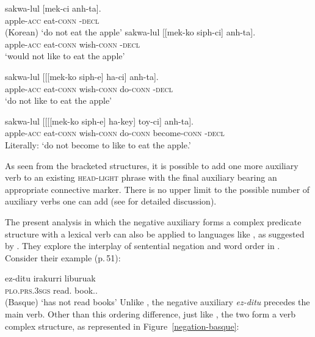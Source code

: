 \documentclass[output=paper
 	        ,biblatex
                ,babelshorthands
                ,newtxmath
                ,draftmode
                ,colorlinks, citecolor=brown
]{langscibook}
\begin{document}
\begin{exe}
\begin{xlist}
\begin{exe}
\begin{xlist}
\eal
\ex
\gll sakwa-lul          [mek-ci anh-ta]. \\
     apple-\textsc{acc} \spacebr{}eat-\textsc{conn} \NEG-\textsc{decl} \\\hfill(Korean)
\glt `do not eat the apple'
\ex
\gll sakwa-lul          [[mek-ko siph-ci] anh-ta]. \\
     apple-\textsc{acc} \hphantom{[[}eat-\textsc{conn} wish-\textsc{conn} \NEG-\textsc{decl} \\
\glt `would not like to eat the apple'

\ex \label{negation-20c}
\gll sakwa-lul          [[[mek-ko siph-e] ha-ci] anh-ta]. \\
     apple-\textsc{acc} \hphantom{[[[}eat-\textsc{conn} wish-\textsc{conn} do-\textsc{conn} \NEG-\textsc{decl} \\
\glt `do not like to eat the apple'

\ex
\gll sakwa-lul          [[[[mek-ko siph-e] ha-key] toy-ci] anh-ta]. \\
     apple-\textsc{acc} \hphantom{[[[[}eat-\textsc{conn} wish-\textsc{conn} do-\textsc{conn} become-\textsc{conn} \NEG-\textsc{decl} \\
\glt Literally: `do not become to like to eat the apple.'
\end{xlist} \end{exe}
%
As seen from the bracketed structures, it is possible to add one more auxiliary verb to
an existing \textsc{head-light} phrase with the final auxiliary bearing an appropriate
  connective marker. There is no upper limit to the possible number  of auxiliary
  verbs one can add (see \citealt[]{Kim:16} for detailed discussion).

The present analysis in which the  negative auxiliary forms a complex
predicate structure with a lexical verb can also be applied to languages
like , as suggested by \citet{CB:11}. They explore the interplay of sentential
negation and word order in . Consider their example (p.\,51):

\ea
\label{negation-basque-ex}
\gll ez-ditu irakurri liburuak \\
     \textsc{plo}.\textsc{prs}.\textsc{3sgs} read.\PRF{} book.\ABS.\pl\\\hfill(Basque)
\glt `has not read books'
\z
%
%
Unlike , the negative auxiliary \textit{ez-ditu} precedes
the main verb. Other than this ordering difference, just
like , the two form a verb complex structure, as represented in
Figure~\ref{negation-basque}:


\end{xlist}
\end{exe}
\end{document}

